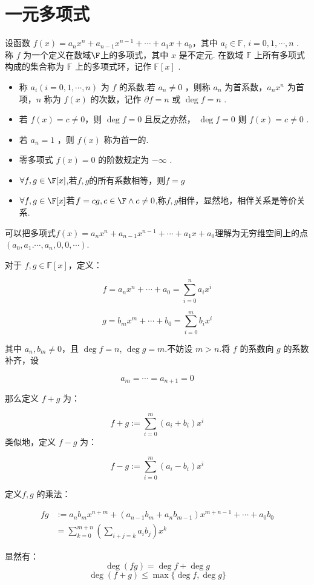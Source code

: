 \section{一元多项式}
\begin{definition}
	设函数  $f(x) = a_n x^n + a_{n-1} x^{n-1} + \cdots + a_1 x + a_0 $，其中 $ a_i \in \mathbb{F}$, $i=0,1,\cdots,n$ .
	称  $f $ 为一个定义在数域$\F$上的多项式，其中  $x $ 是不定元.
	在数域  $\mathbb{F}$  上所有多项式构成的集合称为  $\mathbb{F} $ 上的多项式环，记作 $ \mathbb{F}[x]$ .
	\begin{itemize}
		\item 称  $a_i (i=0,1,\cdots,n)$  为  $f$  的系数.若  $a_n \neq 0$ ，则称 $a_n$  为首系数，$ a_n x^n $ 为首项，$n $ 称为  $f(x)$ 的次数，记作 $ \partial f = n $ 或  $\deg f = n$ .
		\item 若  $f(x) = c \neq 0 $，则  $\deg f = 0$  且反之亦然， $\deg f = 0$  则 $ f(x) = c \neq 0$ .
		\item 若 $ a_n = 1$ ，则  $f(x)$  称为首一的.
		\item 零多项式 $f(x) = 0$  的阶数规定为 $-\infty$ .
		\item $\forall f,g\in \F[x]$,若$f,g$的所有系数相等，则$f=g$
		\item $\forall f,g\in \F[x]$若$f=cg,c\in\F\wedge c\neq0$,称$ f,g$相伴，显然地，相伴关系是等价关系.
	\end{itemize}
	
\end{definition}
可以把多项式$f(x)= a_n x^n + a_{n-1} x^{n-1} + \cdots + a_1 x + a_0$理解为无穷维空间上的点$(a_0,a_1.\cdots,a_n,0,0,\cdots)$.
\begin{definition}
	对于 \( f, g \in \mathbb{F}[x] \)，定义：
	
	\[
	f = a_n x^n + \cdots + a_0 = \sum_{i=0}^{n} a_i x^i
	\]
	
	\[
	g = b_m x^m + \cdots + b_0 = \sum_{i=0}^{m} b_i x^i
	\]
	
	其中 \( a_n, b_m \neq 0 \)，且 \( \deg f = n \), \( \deg g = m \).不妨设 \( m > n \).将 \( f \) 的系数向 \( g \) 的系数补齐，设
	
	\[
	a_m = \cdots = a_{n+1} = 0 
	\]
	
	那么定义 \( f + g \) 为：
	
	\[
	f + g := \sum_{i=0}^{m} (a_i + b_i) x^i
	\]
	类似地，定义 \( f - g \) 为：
	
	\[
	f - g := \sum_{i=0}^{m} (a_i - b_i) x^i
	\]
	
	定义\( f ,g \) 的乘法：
	
	\[\begin{aligned}
		fg &:= a_n b_m x^{n+m} + (a_{n-1} b_m + a_n b_{m-1}) x^{m+n-1} + \cdots + a_0 b_0\\
		&= \sum_{k=0}^{m+n} \left( \sum_{i+j=k} a_i b_j \right) x^k
	\end{aligned}\]
	
\end{definition}
显然有：
	\[\deg(fg) = \deg f + \deg g\]
	\[\deg(f + g) \leqslant \max \{ \deg f, \deg g \}\]
	
